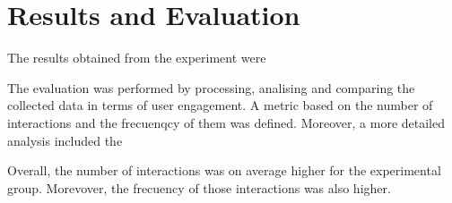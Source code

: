 
\chapter{Results and Evaluation} %

\label{resu} %


The results obtained from the experiment were

The evaluation was performed by processing, analising and comparing the collected data in terms of user engagement. A metric based on the number of interactions and the frecuenqcy of them was defined. Moreover, a more detailed analysis included the

Overall, the number of interactions was on average higher for the experimental group. Morevover, the frecuency of those interactions was also higher.

